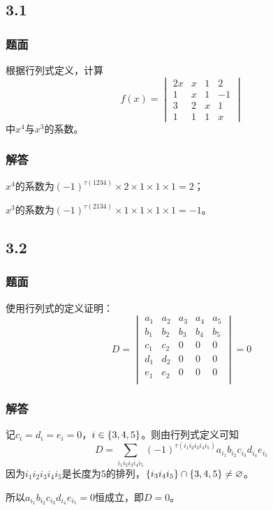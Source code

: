\documentclass[10pt,xcolor=svgnames]{beamer} %
\begin{document}
\subsection*{3.1}
\begin{frame}
    \frametitle{题面}
    根据行列式定义，计算
    \begin{equation*}
        f(x)=
        \begin{vmatrix}
            2x & x & 1 & 2  \\
            1  & x & 1 & -1 \\
            3  & 2 & x & 1  \\
            1  & 1 & 1 & x
        \end{vmatrix}
    \end{equation*}
    中\(x^4\)与\(x^3\)的系数。
\end{frame}
\begin{frame}
    \frametitle{解答}
    \(x^4\)的系数为\((-1)^{\tau(1234)}\times2\times1\times1\times1=2\)；

    \(x^3\)的系数为\((-1)^{\tau(2134)}\times1\times1\times1\times1=-1\)。
\end{frame}

\subsection*{3.2}
\begin{frame}
    \frametitle{题面}
    使用行列式的定义证明：
    \begin{equation*}
        D=
        \begin{vmatrix}
            a_1 & a_2 & a_3 & a_4 & a_5 \\
            b_1 & b_2 & b_3 & b_4 & b_5 \\
            c_1 & c_2 & 0   & 0   & 0   \\
            d_1 & d_2 & 0   & 0   & 0   \\
            e_1 & e_2 & 0   & 0   & 0   \\
        \end{vmatrix}=0
    \end{equation*}
\end{frame}
\begin{frame}
    \frametitle{解答}
    记\(c_i=d_i=e_i=0\)，\(i\in\left\{3,4,5 \right\}\)。则由行列式定义可知
    \begin{equation*}
        D=\sum_{i_1i_2i_3i_4i_5}(-1)^{\tau(i_1i_2i_3i_4i_5)}a_{i_1}b_{i_2}c_{i_3}d_{i_4}e_{i_5}
    \end{equation*}
    因为\(i_1i_2i_3i_4i_5\)是长度为\(5\)的排列，\(\left\{i_3i_4i_5 \right\}\cap\left\{3,4,5 \right\}\neq\varnothing\)。

    所以\(a_{i_1}b_{i_2}c_{i_3}d_{i_4}e_{i_5}=0\)恒成立，即\(D=0\)。
\end{frame}
\end{document}
